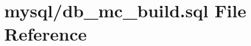 \hypertarget{db__mc__build_8sql}{\section{mysql/db\-\_\-mc\-\_\-build.sql File Reference}
\label{db__mc__build_8sql}
}
